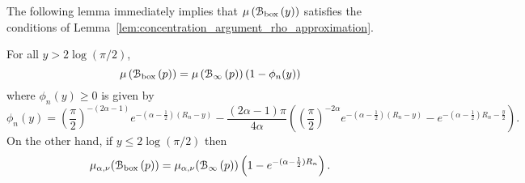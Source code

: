 The following lemma immediately implies that $\mu\left({\mathcal B}_{\text{box}}\left(y\right)\right)$ satisfies the conditions of Lemma~\ref{lem:concentration_argument_rho_approximation}.

\begin{lemma}\label{lem:average_degree_P_n}
For all $y > 2\log(\pi/2)$,
\[
	\mu\left({\mathcal B}_{\text{box}}\left(p\right)\right) = \mu\left({\mathcal B}_{\infty}\left(p\right)\right)\left(1 - \phi_n(y)\right)
\]
where $\phi_n(y) \ge 0$ is given by
\[
	\phi_n(y) = \left(\frac{\pi}{2}\right)^{-(2\alpha - 1)}e^{-(\alpha-\frac{1}{2})(R_n - y)}
	- \frac{(2\alpha - 1)\pi}{4\alpha}\left(\left(\frac{\pi}{2}\right)^{-2\alpha} 
	e^{-(\alpha - \frac{1}{2})(R_n - y)} - e^{-(\alpha - \frac{1}{2})R_n - \frac{y}{2}}\right).
\]
On the other hand, if $y \le 2 \log(\pi/2)$ then
\[
	\mu_{\alpha,\nu}({\mathcal B}_{\text{box}}\left(p\right)) = \mu_{\alpha,\nu}({\mathcal B}_{\infty}\left(p\right))\left(1 - e^{-(\alpha - \frac{1}{2})R_n}\right).
\]
\end{lemma}


